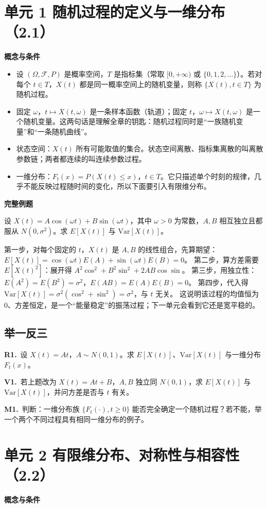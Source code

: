 \documentclass[UTF8,a4paper,11pt]{ctexart}
\newcommand{\CompactQuestion}[2]{\par\noindent\textbf{#1.}\ #2\par\vspace{.8em}}
\begin{document}
\clearpage
{}
\section{单元 1 随机过程的定义与一维分布（2.1）}
\textbf{概念与条件}

\begin{itemize}
\item 设 $(\Omega,\mathcal{F},P)$ 是概率空间，$T$ 是指标集（常取 $[0,+\infty)$ 或 $\{0,1,2,\dots\}$）。若对每个 $t\in T$，$X(t)$ 都是同一概率空间上的随机变量，则称 $\{X(t),t\in T\}$ 为随机过程。
\item 固定 $\omega$，$t\mapsto X(t,\omega)$ 是一条样本函数（轨道）；固定 $t$，$\omega\mapsto X(t,\omega)$ 是一个随机变量。这两句话是理解全章的钥匙：随机过程同时是“一族随机变量”和“一条随机曲线”。
\item 状态空间：$X(t)$ 所有可能取值的集合。状态空间离散、指标集离散的叫离散参数链；两者都连续的叫连续参数过程。
\item 一维分布：$F_t(x)=P(X(t)\le x)$，$t\in T$。它只描述单个时刻的规律，几乎不能反映过程随时间的变化，所以下面要引入有限维分布。
\end{itemize}
\textbf{完整例题}

设 $X(t)=A\cos(\omega t)+B\sin(\omega t)$，其中 $\omega>0$ 为常数，$A,B$ 相互独立且都服从 $N(0,\sigma^2)$。求 $E[X(t)]$ 与 $\mathrm{Var}[X(t)]$。

第一步，对每个固定的 $t$，$X(t)$ 是 $A,B$ 的线性组合，先算期望：$E[X(t)]=\cos(\omega t)E(A)+\sin(\omega t)E(B)=0$。 第二步，算方差需要 $E[X(t)^2]$：展开得 $A^2\cos^2+B^2\sin^2+2AB\cos\sin$。 第三步，用独立性：$E(A^2)=E(B^2)=\sigma^2$，$E(AB)=E(A)E(B)=0$。 第四步，代入得 $\mathrm{Var}[X(t)]=\sigma^2(\cos^2+\sin^2)=\sigma^2$，与 $t$ 无关。 这说明该过程的均值恒为 0、方差恒定，是一个“能量稳定”的振荡过程；下一单元会看到它还是宽平稳的。

\subsection{举一反三}
\CompactQuestion{R1}{设 $X(t)=A t$，$A\sim N(0,1)$。求 $E[X(t)]$、$\mathrm{Var}[X(t)]$ 与一维分布 $F_t(x)$。}
\CompactQuestion{V1}{若上题改为 $X(t)=A t+B$，$A,B$ 独立同 $N(0,1)$，求 $E[X(t)]$ 与 $\mathrm{Var}[X(t)]$，并问方差是否与 $t$ 有关。}
\CompactQuestion{M1}{判断：一维分布族 $\{F_t(\cdot),t\ge0\}$ 能否完全确定一个随机过程？若不能，举一个两个不同过程具有相同一维分布的例子。}
\clearpage
{}
\section{单元 2 有限维分布、对称性与相容性（2.2）}
\textbf{概念与条件}
\end{document}
